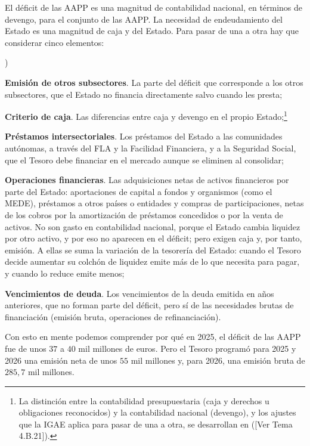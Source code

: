 \documentclass[10pt,a4paper]{article}
\newcounter{alphaitem}
\newenvironment{la}
      {\begin{list}{\alph{alphaitem})}{%
          \usecounter{alphaitem}%
          \setlength{\leftmargin}{1cm}%
          \setlength{\parskip}{3pt}%
          \setlength{\itemsep}{0pt}%
          \setlength{\parsep}{0pt}%
      }}
      {\end{list}}
\newcommand{\authorfont}[1]{{\fontfamily{EBGaramond-TLF}\selectfont #1}}
\begin{document}
El déficit de las AAPP es una magnitud de contabilidad nacional, en términos de devengo, para el conjunto de las AAPP. La necesidad de endeudamiento del Estado es una magnitud de caja y del Estado. Para pasar de una a otra hay que considerar cinco elementos:
\begin{la}
    \item \textbf{Emisión de otros subsectores}. La parte del déficit que corresponde a los otros subsectores, que el Estado no financia directamente salvo cuando les presta;
    \item \textbf{Criterio de caja}. Las diferencias entre caja y devengo en el propio Estado;\footnote{%
        La distinción entre la contabilidad presupuestaria (caja y derechos u obligaciones reconocidos) y la contabilidad nacional (devengo), y los ajustes que la IGAE aplica para pasar de una a otra, se desarrollan en ([\authorfont{Ver Tema 4.B.21}]).
    }
    \item \textbf{Préstamos intersectoriales}. Los préstamos del Estado a las comunidades autónomas, a través del FLA y la Facilidad Financiera, y a la Seguridad Social, que el Tesoro debe financiar en el mercado aunque se eliminen al consolidar;
    \item \textbf{Operaciones financieras}. Las adquisiciones netas de activos financieros por parte del Estado: aportaciones de capital a fondos y organismos (como el MEDE), préstamos a otros países o entidades y compras de participaciones, netas de los cobros por la amortización de préstamos concedidos o por la venta de activos. No son gasto en contabilidad nacional, porque el Estado cambia liquidez por otro activo, y por eso no aparecen en el déficit; pero exigen caja y, por tanto, emisión. A ellas se suma la variación de la tesorería del Estado: cuando el Tesoro decide aumentar su colchón de liquidez emite más de lo que necesita para pagar, y cuando lo reduce emite menos;
    \item \textbf{Vencimientos de deuda}. Los vencimientos de la deuda emitida en años anteriores, que no forman parte del déficit, pero sí de las necesidades brutas de financiación (emisión bruta, operaciones de refinanciación).
\end{la}

Con esto en mente podemos comprender por qué en 2025, el déficit de las AAPP fue de unos $37$ a $40$ mil millones de euros. Pero el Tesoro programó para 2025 y 2026 una emisión neta de unos $55$ mil millones y, para 2026, una emisión bruta de $285,7$ mil millones. 
\end{document}
